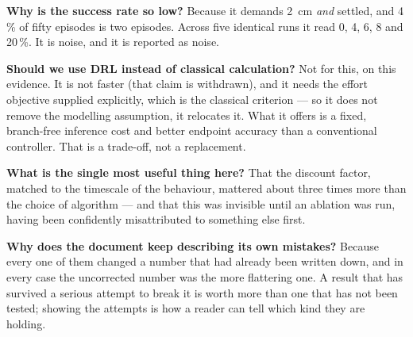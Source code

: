 \textbf{Why is the success rate so low?} Because it demands \SI{2}{\centi\meter}
\emph{and} settled, and 4\,\% of fifty episodes is two episodes. Across five
identical runs it read 0, 4, 6, 8 and 20\,\%. It is noise, and it is reported as
noise.

\textbf{Should we use DRL instead of classical calculation?} Not for this, on this
evidence. It is not faster (that claim is withdrawn), and it needs the effort
objective supplied explicitly, which is the classical criterion --- so it does not
remove the modelling assumption, it relocates it. What it offers is a fixed,
branch-free inference cost and better endpoint accuracy than a conventional
controller. That is a trade-off, not a replacement.

\textbf{What is the single most useful thing here?} That the discount factor,
matched to the timescale of the behaviour, mattered about three times more than
the choice of algorithm --- and that this was invisible until an ablation was run,
having been confidently misattributed to something else first.

\textbf{Why does the document keep describing its own mistakes?} Because every
one of them changed a number that had already been written down, and in every
case the uncorrected number was the more flattering one. A result that has
survived a serious attempt to break it is worth more than one that has not been
tested; showing the attempts is how a reader can tell which kind they are
holding.
